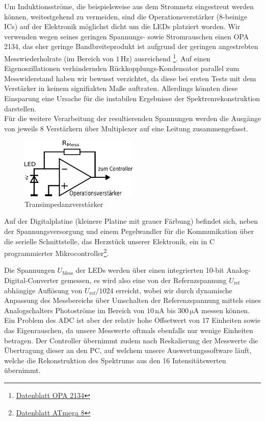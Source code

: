 \documentclass[11pt]{scrartcl}
\newcommand{\unit}[1]{\ensuremath{\,\mathrm{#1}}} %
\begin{document}
Um Induktionsströme, die beispielsweise aus dem Stromnetz eingestreut werden können, weitestgehend zu vermeiden, sind die Operationsverstärker (8-beinige ICs) auf der Elektronik möglichst dicht um die LEDs platziert worden. Wir verwenden wegen seines geringen Spannungs- sowie Stromrauschen einen OPA 2134, das eher geringe Bandbreiteprodukt ist aufgrund der geringen angestrebten Messwiederholrate (im Bereich von $1 \unit{Hz}$) ausreichend \footnote{\href{http://focus.ti.com/general/docs/lit/getliterature.tsp?genericPartNumber=opa2134&fileType=pdf}{Datenblatt OPA 2134}}. Auf einen Eigenoszillationen verhindernden Rückkopplungs-Kondensator parallel zum Messwiderstand haben wir bewusst verzichtet, da diese bei ersten Tests mit dem Verstärker in keinem signifiakten Maße auftraten. Allerdings könnten diese Einsparung eine Ursache für die instabilen Ergebnisse der Spektrenrekonstruktion darstellen. \\
Für die weitere Verarbeitung der resultierenden Spannungen werden die Ausgänge von jeweils 8 Verstärkern über Multiplexer auf eine Leitung zusammengefasst.

\begin{figure}[H]
\begin{center}
\includegraphics[width=0.5\textwidth]{transimp.png}
\end{center}
\vspace{-1.5\baselineskip}
\caption{Transimpedanzverstärker}
\label{fig:transimp}
\end{figure}

Auf der Digitalplatine (kleinere Platine mit grauer Färbung) befindet sich, neben der Spannungsversorgung und einem Pegelwandler für die Kommunikation über die serielle Schnittstelle,  das Herzstück unserer Elektronik, ein in C programmierter Mikrocontroller\footnote{\href{http://www.atmel.com/dyn/resources/prod_documents/doc2486.pdf}{Datenblatt ATmega 8}}.

Die Spannungen $U_{\text{Mess}}$ der LEDs werden über einen integrierten 10-bit Analog-Digital-Converter gemessen, es wird also eine von der Refernzspannung $U_{\text{ref}}$ abhängige Auflösung von $U_{\text{ref}}/1024$ erreicht, wobei wir durch dynamische Anpassung des Messbereichs über Umschalten der Referenzspannung mittels eines Analogschalters Photoströme im Bereich von $10 \unit{nA}$ bis $300 \unit{\mu A}$ messen können. Ein Problem des ADC ist aber der relativ hohe Offsetwert von 17 Einheiten sowie das Eigenrauschen, da unsere Messwerte oftmals ebenfalls nur wenige Einheiten betragen. Der Controller übernimmt zudem nach Reskalierung der Messwerte die Übertragung dieser an den PC, auf welchem unsere Auswertungssoftware läuft, welche die Rekonstruktion des Spektrums aus den 16 Intensitätswerten übernimmt.
\end{document}
